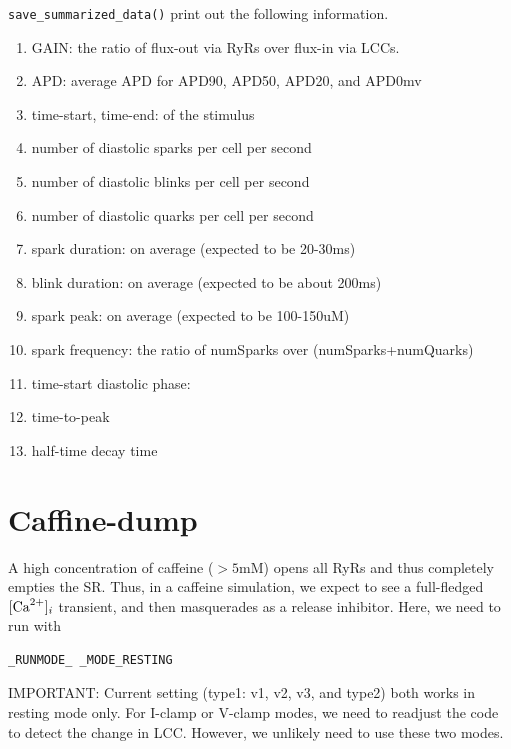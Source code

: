 \verb!save_summarized_data()! print out the following information.
\begin{enumerate}
  \item GAIN: the ratio of flux-out via RyRs over flux-in via LCCs.
  \item APD: average APD for APD90, APD50, APD20, and APD0mv
  \item time-start, time-end: of the stimulus
  \item number of diastolic sparks per cell per second
  \item number of diastolic blinks per cell per second
  \item number of diastolic quarks per cell per second
  \item spark duration: on average (expected to be 20-30ms)
  \item blink duration: on average (expected to be about 200ms)
  \item spark peak: on average (expected to be 100-150uM)
  \item spark frequency: the ratio of numSparks over (numSparks+numQuarks)
  \item time-start diastolic phase:
  \item time-to-peak
  \item half-time decay time
\end{enumerate}



\section{Caffine-dump}
\label{sec:caffeine-dump}

A high concentration of caffeine ($> 5$mM) opens all RyRs and thus completely
empties the SR. Thus, in a caffeine simulation, we expect to see a full-fledged
$[{\text{Ca}^{2+}}]_i$ transient, and then masquerades as a release inhibitor. Here, we need
to run with 
\begin{verbatim}
_RUNMODE_ _MODE_RESTING
\end{verbatim}

IMPORTANT: Current setting (type1: v1, v2, v3, and type2) both works in resting
mode only. For I-clamp or V-clamp modes, we need to readjust the code to detect
the change in LCC. However, we unlikely need to use these two modes.

